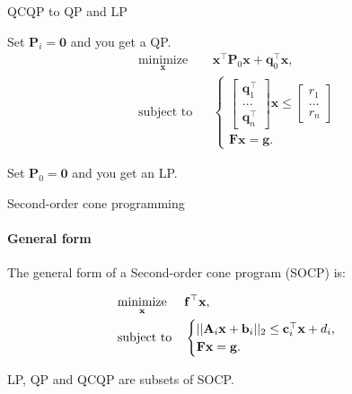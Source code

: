 \documentclass{beamer}
\begin{document}
\begin{frame}{QCQP to QP and LP}
\begin{flushleft}

Set $\mathbf{P}_i = \mathbf{0}$ and you get a QP.
%
\begin{equation}
\begin{aligned}
& \underset{\mathbf{x}}{\text{minimize}}
& & \mathbf{x}^\top \mathbf{P}_0 \mathbf{x} + \mathbf{q}_0^\top\mathbf{x}, \\
& \text{subject to}
& & \begin{cases}
    \begin{bmatrix} 
    \mathbf{q}_1^\top \\ ... \\ \mathbf{q}_n^\top
    \end{bmatrix} 
    \mathbf{x} \leq
    \begin{bmatrix} 
    r_1 \\ ... \\ r_n
    \end{bmatrix} \\
    \mathbf{F}\mathbf{x} = \mathbf{g}.
    \end{cases}
\end{aligned}
\end{equation}

Set $\mathbf{P}_0 = \mathbf{0}$ and you get an LP.

\end{flushleft}
\end{frame}




\begin{frame}{Second-order cone programming}
\framesubtitle{General form}
\begin{flushleft}


The general form of a Second-order cone program (SOCP) is:

%
\begin{equation}
\begin{aligned}
& \underset{\mathbf{x}}{\text{minimize}}
& & \mathbf{f}^\top\mathbf{x}, \\
& \text{subject to}
& & \begin{cases}
    ||\mathbf{A}_i\mathbf{x} + \mathbf{b}_i||_2 \leq 
     \mathbf{c}_i^\top \mathbf{x} + d_i, \\
    \mathbf{F}\mathbf{x} = \mathbf{g}.
    \end{cases}
\end{aligned}
\end{equation}

LP, QP and QCQP are subsets of SOCP.
 
\end{flushleft}
\end{frame}
\end{document}
